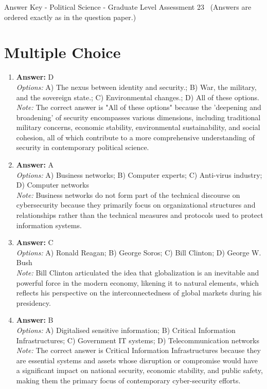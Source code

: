 \documentclass[12pt]{article}
\begin{document}
\begin{center}
Answer Key - Political Science - Graduate Level Assessment 23 \
\small (Answers are ordered exactly as in the question paper.)
\end{center}

\section*{Multiple Choice}
\begin{enumerate}[label=\arabic*.]
\item \textbf{Answer:} D
\\ \textit{Options:} A) The nexus between identity and security.; B) War, the military, and the sovereign state.; C) Environmental changes.; D) All of these options.
\\ \textit{Note:} The correct answer is "All of these options" because the 'deepening and broadening' of security encompasses various dimensions, including traditional military concerns, economic stability, environmental sustainability, and social cohesion, all of which contribute to a more comprehensive understanding of security in contemporary political science.
\item \textbf{Answer:} A
\\ \textit{Options:} A) Business networks; B) Computer experts; C) Anti-virus industry; D) Computer networks
\\ \textit{Note:} Business networks do not form part of the technical discourse on cybersecurity because they primarily focus on organizational structures and relationships rather than the technical measures and protocols used to protect information systems.
\item \textbf{Answer:} C
\\ \textit{Options:} A) Ronald Reagan; B) George Soros; C) Bill Clinton; D) George W. Bush
\\ \textit{Note:} Bill Clinton articulated the idea that globalization is an inevitable and powerful force in the modern economy, likening it to natural elements, which reflects his perspective on the interconnectedness of global markets during his presidency.
\item \textbf{Answer:} B
\\ \textit{Options:} A) Digitalised sensitive information; B) Critical Information Infrastructures; C) Government IT systems; D) Telecommunication networks
\\ \textit{Note:} The correct answer is Critical Information Infrastructures because they are essential systems and assets whose disruption or compromise would have a significant impact on national security, economic stability, and public safety, making them the primary focus of contemporary cyber-security efforts.

\end{enumerate}
\end{document}
